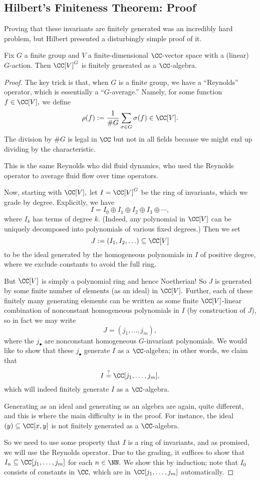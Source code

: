 \documentclass[../notes.tex]{subfiles}
\begin{document}
\subsection{Hilbert's Finiteness Theorem: Proof}
Proving that these invariants are finitely generated was an incredibly hard problem, but Hilbert presented a disturbingly simple proof of it.
\begin{theorem}
	Fix $G$ a finite group and $V$ a finite-dimensional $\CC$-vector space with a (linear) $G$-action. Then $\CC[V]^G$ is finitely generated as a $\CC$-algebra.
\end{theorem}
\begin{proof}
	The key trick is that, when $G$ is a finite group, we have a ``Reynolds'' operator, which is essentially a ``$G$-average.'' Namely, for some function $f\in\CC[V],$ we define
	\[\rho(f):=\frac1{\#G}\sum_{\sigma\in G}\sigma(f)\in\CC[V].\]
	The division by $\#G$ is legal in $\CC$ but not in all fields because we might end up dividing by the characteristic.
	\begin{remark}
		This is the same Reynolds who did fluid dynamics, who used the Reynolds operator to average fluid flow over time operators.
	\end{remark}
	Now, starting with $\CC[V],$ let $I=\CC[V]^G$ be the ring of invariants, which we grade by degree. Explicitly, we have
	\[I=I_0\oplus I_1\oplus I_2\oplus I_3\oplus\cdots,\]
	where $I_k$ has terms of degree $k.$ (Indeed, any polynomial in $\CC[V]$ can be uniquely decomposed into polynomials of various fixed degrees.) Then we set
	\[J:=(I_1,I_2,\ldots)\subseteq\CC[V]\]
	to be the ideal generated by the homogeneous polynomials in $I$ of positive degree, where we exclude constants to avoid the full ring.

	But $\CC[V]$ is simply a polynomial ring and hence Noetherian! So $J$ is generated by some finite number of elements (as an ideal) in $\CC[V].$ Further, each of these finitely many generating elements can be written as some finite $\CC[V]$-linear combination of nonconstant homogeneous polynomials in $I$ (by construction of $J$), so in fact we may write
	\[J=(j_1,\ldots,j_m),\]
	where the $j_\bullet$ are nonconstant homogeneous $G$-invariant polynomials. We would like to show that these $j_\bullet$ generate $I$ as a $\CC$-algebra; in other words, we claim that
	\[I\stackrel?=\CC[j_1,\ldots,j_m],\]
	which will indeed finitely generate $I$ as a $\CC$-algebra.
	\begin{remark}
		Generating as an ideal and generating as an algebra are again, quite different, and this is where the main difficulty is in the proof. For instance, the ideal $(y)\subseteq\CC[x,y]$ is not finitely generated as a $\CC$-algebra.
	\end{remark}
	So we need to use some property that $I$ is a ring of invariants, and as promised, we will use the Reynolds operator. Due to the grading, it suffices to show that $I_n\subseteq\CC[j_1,\ldots,j_m]$ for each $n\in\NN.$ We show this by induction; note that $I_0$ consists of constants in $\CC,$ which are in $\CC[j_1,\ldots,j_m]$ automatically.
	

\end{proof}
\end{document}
